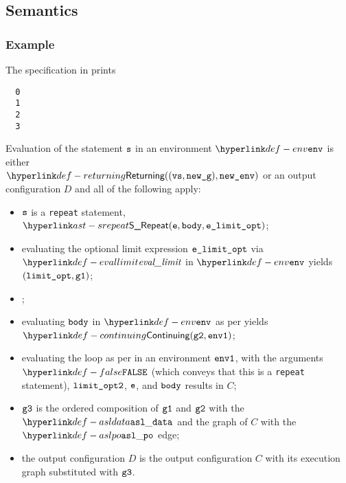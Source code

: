 \subsection{Semantics}
\subsubsection{Example}
The specification in  prints
\begin{Verbatim}
  0
  1
  2
  3
\end{Verbatim}

\ProseParagraph
Evaluation of the statement $\texttt{s}$ in an environment $\env$ is
either \\ $\Returning((\vvs, \newg), \newenv)$ or an output configuration $D$ and all of the following apply:
\begin{itemize}
  \item $\texttt{s}$ is a \texttt{repeat} statement, $\SRepeat(\ve, \vbody, \velimitopt)$;
  \item evaluating the optional limit expression $\texttt{e\_limit\_opt}$ via $\evallimit$ in $\env$
        yields $(\texttt{limit\_opt}, \texttt{g1})$\ProseOrError;
  \item \Proseticklooplimit{$\vlimitoptone$}{$\vlimitopttwo$}\ProseOrError;
  \item evaluating $\texttt{body}$ in $\env$ as per 
        yields $\Continuing(\vgtwo, \envone)$\ProseTerminateAs{\ReturningConfig,\ThrowingConfig,\DynErrorConfig};
  \item evaluating the loop as per  in an environment $\texttt{env1}$,
        with the arguments $\False$ (which conveys that this is a \texttt{repeat} statement),
        $\vlimitopttwo$,
        $\texttt{e}$,
        and $\texttt{body}$
        results in $C$;
  \item $\texttt{g3}$ is the ordered composition of $\texttt{g1}$ and $\texttt{g2}$ with the $\asldata$ and the graph of $C$
        with the $\aslpo$ edge;
  \item the output configuration $D$ is the output configuration $C$ with its execution graph
        substituted with $\texttt{g3}$.
\end{itemize}
\FormallyParagraph
